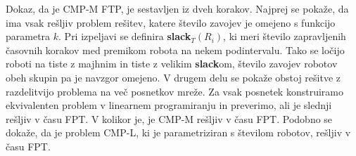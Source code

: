 \documentclass{article}
\newtheorem{definicija}{Definicija}
\begin{document}
Dokaz, da je CMP-M FTP, je sestavljen iz dveh korakov. Najprej se pokaže, da ima vsak rešljiv problem rešitev, katere število zavojev je omejeno s funkcijo parametra $k$. Pri izpeljavi se definira \textbf{slack}$_T (R_i)$, ki meri število zapravljenih časovnih korakov med premikom robota na nekem podintervalu. Tako se ločijo roboti na tiste z majhnim in tiste z velikim \textbf{slack}om, število zavojev robotov obeh skupin pa je navzgor omejeno. 
V drugem delu se pokaže obstoj rešitve z razdelitvijo problema na več posnetkov mreže. Za vsak posnetek konstruiramo ekvivalenten problem v linearnem programiranju in preverimo, ali je slednji rešljiv v času FPT. V kolikor je, je CMP-M rešljiv v času FPT.
Podobno se dokaže, da je problem CMP-L, ki je parametriziran s številom robotov, rešljiv v času FPT. %
\end{document}
